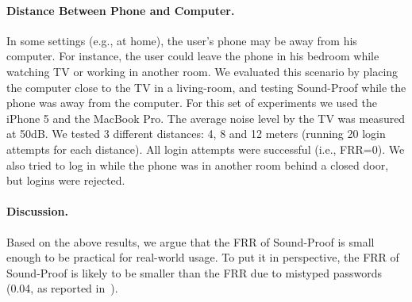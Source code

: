 \paragraph{Distance Between Phone and Computer.}
In some settings (e.g., at home), the user's phone may be away from his computer.
For instance, the user could leave the phone in his bedroom while watching TV or working in another room.
We evaluated this scenario by placing the computer close to the TV in a living-room, and testing Sound-Proof while the phone was away from the computer.
For this set of experiments we used the iPhone 5 and the MacBook Pro.
The average noise level by the TV was measured at 50dB.
We tested 3 different distances: 4, 8 and 12 meters (running 20 login attempts for each distance).
All login attempts were successful (i.e., FRR=0).
We also tried to log in while the phone was in another room behind a closed door, but logins were rejected.

\paragraph{Discussion.}
Based on the above results, we argue that the FRR of Sound-Proof is small enough to be practical for real-world usage. To put it in perspective, the FRR of Sound-Proof is likely to be smaller than the FRR due to mistyped passwords (0.04, as reported in~\cite{kumar07}).


\begin{table}[!ht]
\centering
{}
\caption[False Acceptance Rate when the adversary and the victim devices record the same
broadcast media]{False Acceptance Rate when the adversary and the victim devices record
the same broadcast media. SC-SP stands for ``same city and same Internet/cable
provider'', SC-DP stands for ``same city but different Internet/cable providers'', DC-DP
stands for ``different cities and different Internet/cable providers''. A dash in the
table means that the TV channel was not available at the victim's location.}
\label{tab:ps_sp_tvattack}
\end{table}

